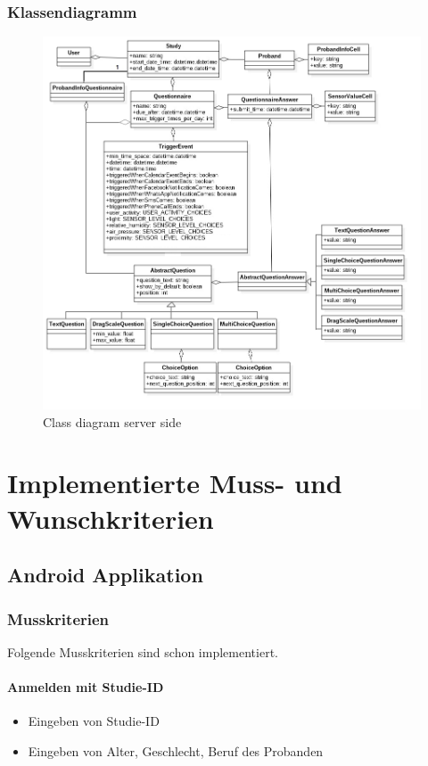 \documentclass[a4paper]{scrreprt}
\begin{document}
            \subsection{Klassendiagramm}
                \begin{figure}[H]
                    \centering
                    \includegraphics[scale = 0.5]{class_diagram_server.jpg}
                    \caption{Class diagram server side}
                \end{figure}


        \newpage
    \chapter{Implementierte Muss- und Wunschkriterien}


        \section{Android Applikation}
        \subsection{Musskriterien}
        \par
        Folgende Musskriterien sind schon implementiert.
                \subsubsection{Anmelden mit Studie-ID}
                    \begin{itemize}
                        \item Eingeben von Studie-ID
                        \item Eingeben von Alter, Geschlecht, Beruf des Probanden
                    \end{itemize}
\end{document}
